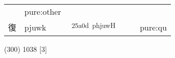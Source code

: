 \documentclass[14pt,a4paper]{scrartcl}
\begin{document}
\begin{longtable}[c]{@{}llllll@{}}
\begin{minipage}[t]{0.14\columnwidth}\raggedright\strut
\strut\end{minipage} &
\begin{minipage}[t]{0.14\columnwidth}\raggedright\strut
pure:other
\strut\end{minipage}\tabularnewline
\begin{minipage}[t]{0.14\columnwidth}\raggedright\strut
復
\strut\end{minipage} &
\begin{minipage}[t]{0.14\columnwidth}\raggedright\strut
pjuwk
\strut\end{minipage} &
\begin{minipage}[t]{0.14\columnwidth}\raggedright\strut
𥨍\textsuperscript{25a0d~phjuwH}
\strut\end{minipage} &
\begin{minipage}[t]{0.14\columnwidth}\raggedright\strut
\strut\end{minipage} &
\begin{minipage}[t]{0.14\columnwidth}\raggedright\strut
\strut\end{minipage} &
\begin{minipage}[t]{0.14\columnwidth}\raggedright\strut
pure:qu
\strut\end{minipage}\tabularnewline
\bottomrule
\end{longtable}

(300) 1038 {[}3{]}
\end{document}
